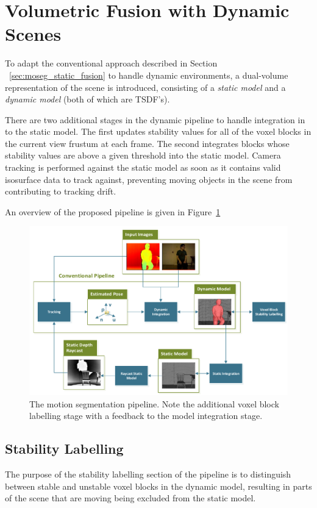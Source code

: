 \section{Volumetric Fusion with Dynamic Scenes}
\label{sec:moseg_dynamic_fusion}
To adapt the conventional approach described in Section
~\ref{sec:moseg_static_fusion} to handle dynamic environments, a dual-volume
representation of the scene is introduced, consisting of a \emph{static model}
and a \emph{dynamic model} (both of which are TSDF's).

There are two additional stages in the dynamic pipeline to handle integration in
to the static model. The first updates stability values for all of the voxel
blocks in the current view frustum at each frame. The second integrates blocks
whose stability values are above a given threshold into the static model.
Camera tracking is performed against the static model as soon as it contains
valid isosurface data to track against, preventing moving objects in the scene
from contributing to tracking drift.

An overview of the proposed pipeline is given in Figure~\ref{fig:moseg_pipeline}
\begin{figure}[h]
  \label{fig:moseg_pipeline}
  \centering
  \includegraphics[width=\linewidth]{figures/moseg/pipeline.pdf}
  \caption[Motion Segmentation Pipeline]{The motion segmentation pipeline. 
  Note the additional voxel block labelling stage with a feedback to the model 
  integration stage.}
\end{figure}

\subsection{Stability Labelling}
\label{sub:moseg_stability_labelling}
The purpose of the stability labelling section of the pipeline is to distinguish
between stable and unstable voxel blocks in the dynamic model, resulting in
parts of the scene that are moving being excluded from the static model.

